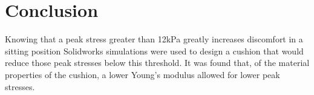 \documentclass[conference]{IEEEtran}
\begin{document}
    

\section{Conclusion}
Knowing that a peak stress greater than 12kPa greatly increases discomfort in a sitting position Solidworks simulations were used to design a cushion that would reduce those peak stresses below this threshold. It was found that, of the material properties of the cushion, a lower Young's modulus allowed for lower peak stresses. 






%




\end{document}
